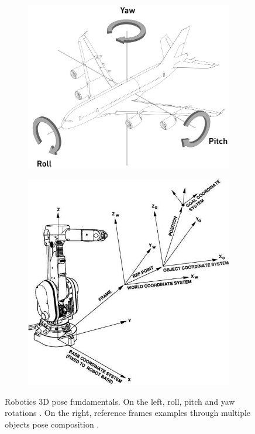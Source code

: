 \begin{figure}[H]
	\begin{center}
		\begin{subfigure}[h]{0.52\textwidth}
			\centering
			\includegraphics[width=1\textwidth]{"contents/images/02-roll-pitch-yaw"}
        	\caption[]{}
	        \label{fig:roll-pitch-yaw}
	    \end{subfigure}
		\hfill
		\begin{subfigure}[h]{0.42\textwidth}
			\centering
			\includegraphics[width=1\textwidth]{"contents/images/02-pose-transform"}
        	\caption[]{}
            \label{fig:pose-transform}
		\end{subfigure}
	\end{center}
	\vspace{-0.5cm}
	\caption[Robotics 3D pose fundamentals]{Robotics 3D pose fundamentals. On the left, roll, pitch and yaw rotations \cite{roll-pitch-yaw}. On the right, reference frames examples through multiple objects pose composition \cite{pose-transform}.}
\end{figure}
